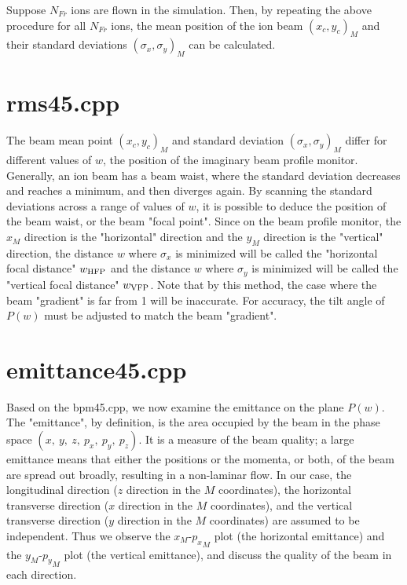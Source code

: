 \documentclass{article}
\begin{document}
Suppose $N_{Fr}$ ions are flown in the simulation. Then, by repeating the above procedure for all $N_{Fr}$ ions, the mean position of the ion beam $(x_c, y_c)_M$ and their standard deviations $(\sigma_x,\sigma_y)_M$ can be calculated.




\section{rms45.cpp}
The beam mean point $(x_c,y_c)_M$ and standard deviation $(\sigma_x,\sigma_y)_M$ differ for different values of $w$, the position of the imaginary beam profile monitor. Generally, an ion beam has a beam waist, where the standard deviation decreases and reaches a minimum, and then diverges again. By scanning the standard deviations across a range of values of $w$, it is possible to deduce the position of the beam waist, or the beam "focal point". Since on the beam profile monitor, the $x_M$ direction is the "horizontal" direction and the $y_M$ direction is the "vertical" direction, the distance $w$ where $\sigma_x$ is minimized will be called the "horizontal focal distance" $w_{{\rm HFP}}$ and the distance $w$ where $\sigma_y$ is minimized will be called the "vertical focal distance" $w_{{\rm VFP}}$. Note that by this method, the case where the beam "gradient" is far from 1 will be inaccurate. For accuracy, the tilt angle of $P(w)$ must be adjusted to match the beam "gradient".




\section{emittance45.cpp}
Based on the bpm45.cpp, we now examine the emittance on the plane $P(w)$. The "emittance", by definition, is the area occupied by the beam in the phase space $(x,\ y,\ z,\ p_x,\ p_y,\ p_z)$. It is a measure of the beam quality; a large emittance means that either the positions or the momenta, or both, of the beam are spread out broadly, resulting in a non-laminar flow. In our case, the longitudinal direction ($z$ direction in the $M$ coordinates), the horizontal transverse direction ($x$ direction in the $M$ coordinates), and the vertical transverse direction ($y$ direction in the $M$ coordinates) are assumed to be independent. Thus we observe the $x_M$-${p_x}_M$ plot (the horizontal emittance) and the $y_M$-${p_y}_M$ plot (the vertical emittance), and discuss the quality of the beam in each direction. \\
\end{document}
